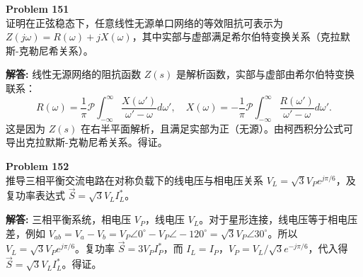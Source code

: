 \documentclass[12pt, a4paper, oneside]{ctexart}
\newenvironment{solution}{\par\noindent\textbf{解答:}\quad}{\par}
\begin{document}
\begin{mdframed}[backgroundcolor=gray!10, linewidth=0pt]
    \textbf{Problem 151} \\
    证明在正弦稳态下，任意线性无源单口网络的等效阻抗可表示为 $Z(j\omega) = R(\omega) + jX(\omega)$，其中实部与虚部满足希尔伯特变换关系（克拉默斯-克勒尼希关系）。
\end{mdframed}
\begin{solution}
    线性无源网络的阻抗函数 $Z(s)$ 是解析函数，实部与虚部由希尔伯特变换联系：
    \[
    R(\omega) = \frac{1}{\pi} \mathcal{P} \int_{-\infty}^\infty \frac{X(\omega')}{\omega' - \omega} d\omega', \quad X(\omega) = -\frac{1}{\pi} \mathcal{P} \int_{-\infty}^\infty \frac{R(\omega')}{\omega' - \omega} d\omega'.
    \]
    这是因为 $Z(s)$ 在右半平面解析，且满足实部为正（无源）。由柯西积分公式可导出克拉默斯-克勒尼希关系。得证。
\end{solution}

\begin{mdframed}[backgroundcolor=gray!10, linewidth=0pt]
    \textbf{Problem 152} \\
    推导三相平衡交流电路在对称负载下的线电压与相电压关系 $V_L = \sqrt{3} V_P e^{j\pi/6}$，及复功率表达式 $\vec{S} = \sqrt{3} V_L I_L^*$。
\end{mdframed}
\begin{solution}
    三相平衡系统，相电压 $V_P$，线电压 $V_L$。对于星形连接，线电压等于相电压差，例如 $V_{ab} = V_a - V_b = V_P \angle 0^\circ - V_P \angle -120^\circ = \sqrt{3} V_P \angle 30^\circ$。所以 $V_L = \sqrt{3} V_P e^{j\pi/6}$。复功率 $\vec{S} = 3 V_P I_P^*$，而 $I_L = I_P$，$V_P = V_L / \sqrt{3} e^{-j\pi/6}$，代入得 $\vec{S} = \sqrt{3} V_L I_L^*$。得证。
\end{solution}
\end{document}
